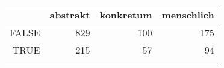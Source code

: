 \begin{tabular}{rrrr}
  \lsptoprule
 & abstrakt & konkretum & menschlich \\ 
  \midrule
FALSE & 829 & 100 & 175 \\ 
  TRUE & 215 &  57 &  94 \\ 
   \lspbottomrule
\end{tabular}

